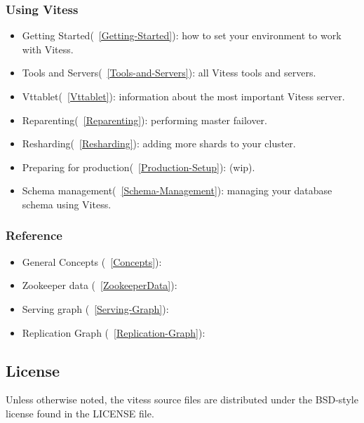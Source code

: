 \subsubsection{Using Vitess}\label{using-vitess}

\begin{itemize}
\item Getting Started(~\ref{Getting-Started}):  how to set your environment to work with Vitess.
\item Tools and Servers(~\ref{Tools-and-Servers}):  all Vitess tools and servers.
\item Vttablet(~\ref{Vttablet}):  information about the most important Vitess server.
\item Reparenting(~\ref{Reparenting}):  performing master failover.
\item Resharding(~\ref{Resharding}):  adding more shards to your cluster.
\item Preparing for production(~\ref{Production-Setup}): (wip).
\item Schema management(~\ref{Schema-Management}): managing your database schema using Vitess.
\end{itemize}

\subsubsection{Reference}

\begin{itemize}
\item General Concepts (~\ref{Concepts}):
\item Zookeeper data (~\ref{ZookeeperData}):
\item Serving graph (~\ref{Serving-Graph}):
\item Replication Graph (~\ref{Replication-Graph}):
\end{itemize}

\subsection{License}\hypertarget{license}{}\label{license}

Unless otherwise noted, the vitess source files are distributed
under the BSD-style license found in the LICENSE file.

